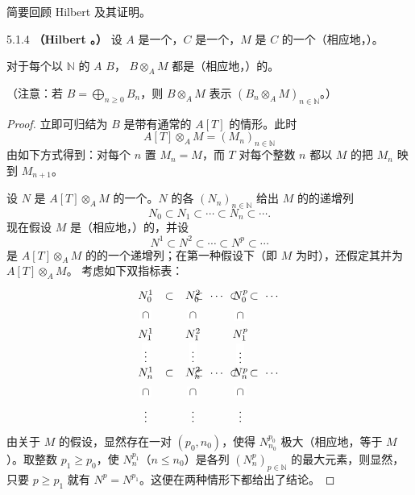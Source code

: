 简要回顾 Hilbert 及其证明。
\begin{SGAresult}{}{5.1.4}
\textbf{（Hilbert 。）} 设 $A$ 是一个，$C$ 是一个，$M$ 是 $C$ 的一个（相应地，）。

对于每个以 $\mathbb N$ 的 $A$  $B$， $B\otimes_A M$ 都是（相应地，）的。

（注意：若 $B=\bigoplus_{n\geq0}B_n$，则 $B\otimes_A M$ 表示 $(B_n\otimes_A M)_{n\in\mathbb N}$。）
\end{SGAresult}
\begin{proof}
立即可归结为 $B$ 是带有通常的 $A[T]$ 的情形。此时
\[
A[T]\otimes_A M=(M_n)_{n\in\mathbb N}
\]
由如下方式得到：对每个 $n$ 置 $M_n=M$，而 $T$ 对每个整数 $n$ 都以 $M$ 的把 $M_n$ 映到 $M_{n+1}$。

设 $N$ 是 $A[T]\otimes_A M$ 的一个。$N$ 的各 $(N_n)_{n\in\mathbb N}$ 给出 $M$ 的的递增列
\[
N_0\subset N_1\subset\cdots\subset N_n\subset\cdots.
\]
现在假设 $M$ 是（相应地，）的，并设
\[
N^1\subset N^2\subset\cdots\subset N^p\subset\cdots
\]
是 $A[T]\otimes_A M$ 的的一个递增列；在第一种假设下（即 $M$ 为时），还假定其并为 $A[T]\otimes_A M$。
考虑如下双指标表：
\[
\begin{tikzcd}[row sep=1.6em,column sep=2em]
N_0^1\arrow[r,phantom,"\subset"]\arrow[d,phantom,"\cap" description]&N_0^2\arrow[r,phantom,"\subset\ \cdots\ \subset"]\arrow[d,phantom,"\cap" description]&N_0^p\arrow[r,phantom,"\subset\ \cdots"]\arrow[d,phantom,"\cap" description]&{}\\
N_1^1\arrow[d,phantom,"\vdots" description]&N_1^2\arrow[d,phantom,"\vdots" description]&N_1^p\arrow[d,phantom,"\vdots" description]&{}\\
N_n^1\arrow[r,phantom,"\subset"]\arrow[d,phantom,"\cap" description]&N_n^2\arrow[r,phantom,"\subset\ \cdots\ \subset"]\arrow[d,phantom,"\cap" description]&N_n^p\arrow[r,phantom,"\subset\ \cdots"]\arrow[d,phantom,"\cap" description]&{}\\
\vdots&\vdots&\vdots&{}
\end{tikzcd}
\]
由关于 $M$ 的假设，显然存在一对 $(p_0,n_0)$，使得 $N_{n_0}^{p_0}$ 极大（相应地，等于 $M$）。取整数 $p_1\geq p_0$，使 $N_n^{p_1}$（$n\leq n_0$）是各列 $(N_n^p)_{p\in\mathbb N}$ 的最大元素，则显然，只要 $p\geq p_1$ 就有 $N^p=N^{p_1}$。这便在两种情形下都给出了结论。
\end{proof}

